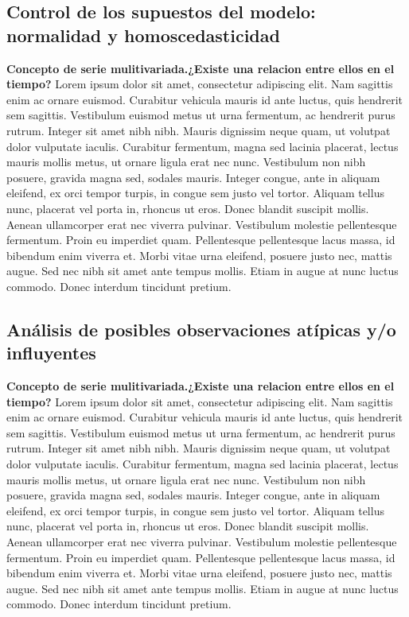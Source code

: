 \documentclass[a4paper,12pt,twocolumn]{article}
\begin{document}
\subsection{Control de los supuestos del modelo: normalidad y homoscedasticidad}
\textbf{Concepto de serie mulitivariada.¿Existe una relacion entre ellos en el tiempo?}
Lorem ipsum dolor sit amet, consectetur adipiscing elit. Nam sagittis enim ac ornare euismod. Curabitur vehicula mauris id ante luctus, quis hendrerit sem sagittis. Vestibulum euismod metus ut urna fermentum, ac hendrerit purus rutrum. Integer sit amet nibh nibh. Mauris dignissim neque quam, ut volutpat dolor vulputate iaculis. Curabitur fermentum, magna sed lacinia placerat, lectus mauris mollis metus, ut ornare ligula erat nec nunc. Vestibulum non nibh posuere, gravida magna sed, sodales mauris. Integer congue, ante in aliquam eleifend, ex orci tempor turpis, in congue sem justo vel tortor. Aliquam tellus nunc, placerat vel porta in, rhoncus ut eros. Donec blandit suscipit mollis. Aenean ullamcorper erat nec viverra pulvinar. 
Vestibulum molestie pellentesque fermentum. Proin eu imperdiet quam. Pellentesque pellentesque lacus massa, id bibendum enim viverra et. Morbi vitae urna eleifend, posuere justo nec, mattis augue. Sed nec nibh sit amet ante tempus mollis. Etiam in augue at nunc luctus commodo. Donec interdum tincidunt pretium. 
\subsection{Análisis de posibles observaciones atípicas y/o influyentes}
\textbf{Concepto de serie mulitivariada.¿Existe una relacion entre ellos en el tiempo?}
Lorem ipsum dolor sit amet, consectetur adipiscing elit. Nam sagittis enim ac ornare euismod. Curabitur vehicula mauris id ante luctus, quis hendrerit sem sagittis. Vestibulum euismod metus ut urna fermentum, ac hendrerit purus rutrum. Integer sit amet nibh nibh. Mauris dignissim neque quam, ut volutpat dolor vulputate iaculis. Curabitur fermentum, magna sed lacinia placerat, lectus mauris mollis metus, ut ornare ligula erat nec nunc. Vestibulum non nibh posuere, gravida magna sed, sodales mauris. Integer congue, ante in aliquam eleifend, ex orci tempor turpis, in congue sem justo vel tortor. Aliquam tellus nunc, placerat vel porta in, rhoncus ut eros. Donec blandit suscipit mollis. Aenean ullamcorper erat nec viverra pulvinar. 
Vestibulum molestie pellentesque fermentum. Proin eu imperdiet quam. Pellentesque pellentesque lacus massa, id bibendum enim viverra et. Morbi vitae urna eleifend, posuere justo nec, mattis augue. Sed nec nibh sit amet ante tempus mollis. Etiam in augue at nunc luctus commodo. Donec interdum tincidunt pretium. 
\end{document}
